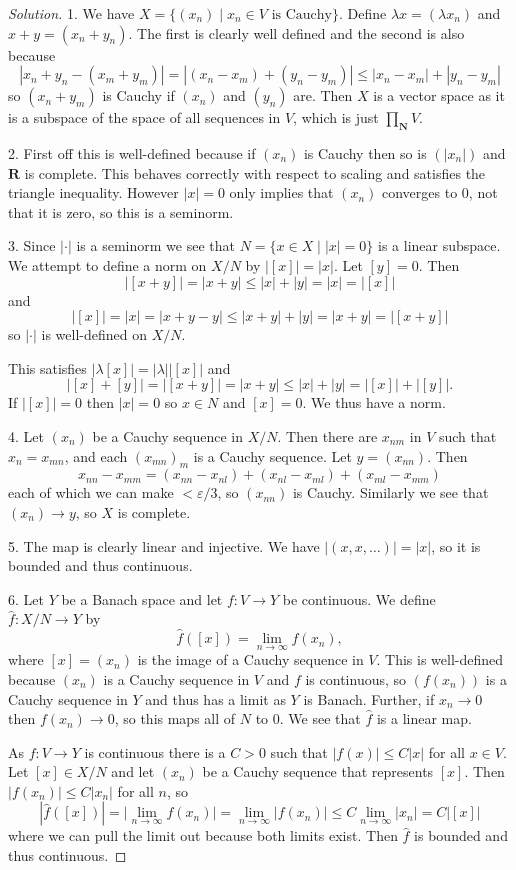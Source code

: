 \documentclass[11pt]{article}
\theoremstyle{definition}
\newcommand{\kk}[1]{\mathbf{#1}}
\begin{document}
\begin{proof}[Solution]
1. We have $X = \{ (x_n) \mid x_n \in V \text{ is Cauchy} \}$.
Define $\lambda x = (\lambda x_n)$ and $x + y = (x_n + y_n)$.
The first is clearly well defined and the second is also because
\[
| x_n + y_n - (x_m + y_m) |
= | (x_n - x_m) + (y_n - y_m) |
\leq |x_n - x_m| + |y_n - y_m|
\]
so $(x_n + y_m)$ is Cauchy if $(x_n)$ and $(y_n)$ are.
Then $X$ is a vector space as it is a subspace of the space of all sequences in
$V$, which is just $\prod_{\kk N} V$.

2. First off this is well-defined because if $(x_n)$ is Cauchy then so is
$(|x_n|)$ and $\kk R$ is complete.
This behaves correctly with respect to scaling and satisfies the triangle
inequality.
However $|x| = 0$ only implies that $(x_n)$ converges to $0$, not that it is
zero, so this is a seminorm.

3. Since $|\cdot|$ is a seminorm we see that $N = \{ x \in X \mid |x| = 0\}$
is a linear subspace.
We attempt to define a norm on $X / N$ by $|[x]| = |x|$.
Let $[y] = 0$. Then
\[
|[x + y]|
= |x + y|
\leq |x| + |y|
= |x|
= |[x]|
\]
and
\[
|[x]|
= |x|
= |x + y - y|
\leq |x+y| + |y|
= |x + y|
= |[x + y]|
\]
so $|\cdot|$ is well-defined on $X / N$.

This satisfies $|\lambda [x]| = |\lambda| |[x]|$
and
\[
|[x] + [y]|
= |[x + y]|
= |x + y|
\leq |x| + |y|
= |[x]| + |[y]|.
\]
If $|[x]| = 0$ then $|x| = 0$ so $x \in N$ and $[x] = 0$.
We thus have a norm.

4. Let $(x_n)$ be a Cauchy sequence in $X/N$. Then there are $x_{nm}$ in $V$ such
that $x_n = x_{mn}$, and each $(x_{mn})_m$ is a Cauchy sequence.
Let $y = (x_{nn})$.
Then
\[
x_{nn} - x_{mm}
= (x_{nn} - x_{nl})
+ (x_{nl} - x_{ml})
+ (x_{ml} - x_{mm})
\]
each of which we can make $< \varepsilon/3$, so $(x_{nn})$ is Cauchy.
Similarly we see that $(x_n) \to y$, so $X$ is complete.

5. The map is clearly linear and injective.
We have $|(x,x,\ldots)| = |x|$, so it is bounded and thus continuous.

6. Let $Y$ be a Banach space and let $f : V \to Y$ be continuous.
We define $\hat f : X/N \to Y$ by
\[
\hat f([x]) = \lim_{n\to \infty} f(x_n),
\]
where $[x] = (x_n)$ is the image of a Cauchy sequence in $V$.
This is well-defined because $(x_n)$ is a Cauchy sequence in $V$ and $f$ is
continuous, so $(f(x_n))$ is a Cauchy sequence in $Y$ and thus has a limit
as $Y$ is Banach.
Further, if $x_n \to 0$ then $f(x_n) \to 0$, so this maps all of $N$ to $0$.
We see that $\hat f$ is a linear map.

As $f : V \to Y$ is continuous there is a $C > 0$ such that $|f(x)| \leq C |x|$
for all $x \in V$.
Let $[x] \in X / N$ and let $(x_n)$ be a Cauchy sequence that represents $[x]$.
Then $|f(x_n)| \leq C |x_n|$ for all $n$, so
\[
|\hat f([x])|
= \biggl| \lim_{n \to \infty} f(x_n) \biggr|
= \lim_{n \to \infty} | f(x_n) |
\leq C \lim_{n \to \infty} |x_n|
= C |[x]|
\]
where we can pull the limit out because both limits exist.
Then $\hat f$ is bounded and thus continuous.
\end{proof}
\end{document}
